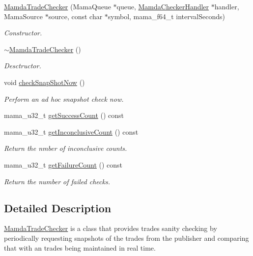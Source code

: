 \begin{CompactItemize}
\item 
\hyperlink{classWombat_1_1MamdaTradeChecker_9964b7fcd51f6da299c0188501bf0737}{Mamda\-Trade\-Checker} (Mama\-Queue $\ast$queue, \hyperlink{classWombat_1_1MamdaCheckerHandler}{Mamda\-Checker\-Handler} $\ast$handler, Mama\-Source $\ast$source, const char $\ast$symbol, mama\_\-f64\_\-t interval\-Seconds)
\begin{CompactList}\small\item\em Constructor. \item\end{CompactList}\item 
\hyperlink{classWombat_1_1MamdaTradeChecker_2eae95f41e52377a28985bb3adf25079}{$\sim$Mamda\-Trade\-Checker} ()
\begin{CompactList}\small\item\em Desctructor. \item\end{CompactList}\item 
void \hyperlink{classWombat_1_1MamdaTradeChecker_8cd6151eec6a3ddba8b3dc45406bfbd2}{check\-Snap\-Shot\-Now} ()
\begin{CompactList}\small\item\em Perform an ad hoc snapshot check now. \item\end{CompactList}\item 
mama\_\-u32\_\-t \hyperlink{classWombat_1_1MamdaTradeChecker_6c6dde0cd55dd602c984c5a1759c51e7}{get\-Success\-Count} () const 
\item 
mama\_\-u32\_\-t \hyperlink{classWombat_1_1MamdaTradeChecker_d940914dca854c639cac67bb8ca45049}{get\-Inconclusive\-Count} () const 
\begin{CompactList}\small\item\em Return the nmber of inconclusive counts. \item\end{CompactList}\item 
mama\_\-u32\_\-t \hyperlink{classWombat_1_1MamdaTradeChecker_04d7890044b0731514743f646e7cdb02}{get\-Failure\-Count} () const 
\begin{CompactList}\small\item\em Return the number of failed checks. \item\end{CompactList}\end{CompactItemize}


\subsection{Detailed Description}
\hyperlink{classWombat_1_1MamdaTradeChecker}{Mamda\-Trade\-Checker} is a class that provides trades sanity checking by periodically requesting snapshots of the trades from the publisher and comparing that with an trades being maintained in real time. 

